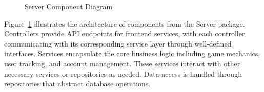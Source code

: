 \documentclass[11pt,a4paper]{article}
\newcommand{\inputdiagram}[1]{}
\newcommand{\textwidthdiagram}[2][1]{%
  \resizebox{#1\textwidth}{!}{\inputdiagram{#2}}%
}
\begin{document}
\begin{figure}[H]
    \centering
    \textwidthdiagram{server_component_diagram.latex}
    \caption{Server Component Diagram}
    \label{fig:server_component_diagram}
\end{figure}

Figure~\ref{fig:server_component_diagram} illustrates the architecture of components from the Server package. Controllers provide API endpoints for frontend services, with each controller communicating with its corresponding service layer through well-defined interfaces. Services encapsulate the core business logic including game mechanics, user tracking, and account management. These services interact with other necessary services or repositories as needed. Data access is handled through repositories that abstract database operations.
\end{document}
